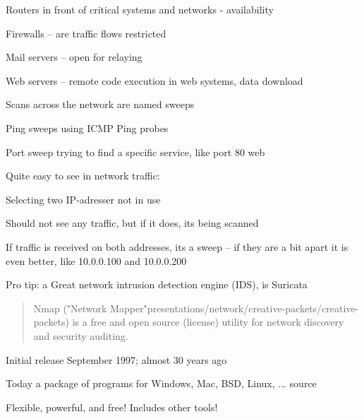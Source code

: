 \documentclass[Screen16to9,17pt]{foils}
\begin{document}

\begin{list2}
\item Routers in front of critical systems and networks - availability
\item Firewalls -- are traffic flows restricted
\item Mail servers -- open for relaying
\item Web servers -- remote code execution in web systems, data download
\end{list2}


\begin{list1}
\item Scans across the network are named sweeps
\item Ping sweeps using ICMP Ping probes
\item Port sweep trying to find a specific service, like port 80 web
\item Quite easy to see in network traffic:
\begin{list2}
\item Selecting two IP-adresser not in use
\item Should not see any traffic, but if it does, its being scanned
\item If traffic is received on both addresses, its a sweep -- if they are a bit apart it is even better, like 10.0.0.100 and 10.0.0.200
  \end{list2}

\vskip 2cm
Pro tip: a Great network intrusion detection engine (IDS), is Suricata 
\end{list1}

\begin{quote}
Nmap ("Network Mapper"presentations/network/creative-packets/creative-packets) is a free and open source (license) utility for network discovery and security auditing.
\end{quote}

\begin{list1}
\item Initial release September 1997; almost 30 years ago
\item Today a package of programs for Windows, Mac, BSD, Linux, ... source
\item Flexible, powerful, and free! Includes other tools!
\end{list1}
\end{document}
